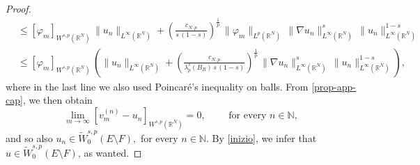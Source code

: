 \documentclass{amsart}
\theoremstyle{definition}
\numberwithin{equation}{section}
\begin{document}
\begin{proof}
\begin{equation*}
\begin{split}
			&\le  [\varphi_m]_{W^{s,p}(\mathbb{R}^N)}\,\|u_n\|_{L^\infty(\mathbb{R}^N)} + \left(\frac{c_{N,p}}{s\,(1-s)}\right)^{\frac{1}{p}}\,\|\varphi_m\|_{L^p(\mathbb{R}^N)}\,\|\nabla u_n\|^s_{L^\infty(\mathbb{R}^N)}\,\|u_n\|^{1-s}_{L^\infty(\mathbb{R}^N)} \\
			&\le [\varphi_m]_{W^{s,p}(\mathbb{R}^N)}\,\left(\|u_n\|_{L^\infty(\mathbb{R}^N)} + \left(\frac{c_{N,p}}{\lambda_{p}^s(B_R)\,s\,(1-s)}\right)^{\frac{1}{p}}\,\|\nabla u_n\|^s_{L^\infty(\mathbb{R}^N)}\,\|u_n\|^{1-s}_{L^\infty(\mathbb{R}^N)}\right),
		\end{split}
	\end{equation*}
	where in the last line we also used Poincar\'e's inequality on balls. From \eqref{prop-app-cap}, we then obtain 
	\begin{equation*}  \label{seminorma-converge}
		\lim_{m \to \infty} [v^{(n)}_m - u_n]_{W^{s,p}(\mathbb{R}^N)} = 0,  \qquad \mbox{ for every } n\in \mathbb{N},
	\end{equation*}
	and so also
	$
	u_n \in \widetilde{W}^{s,p}_0(E \setminus F),
	$
	for every $n \in \mathbb{N}$.
	By \eqref{inizio}, we infer that $u \in \widetilde{W}^{s,p}_0(E \setminus F)$, as wanted. %
\end{proof}
\end{document}
